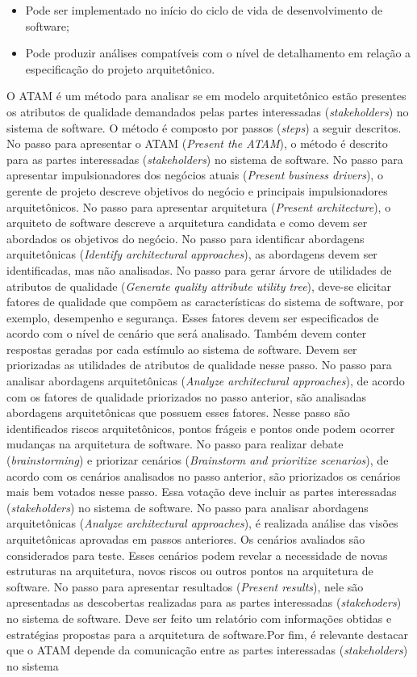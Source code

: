 \begin{itemize}
    \item Pode ser implementado no início do ciclo de vida de desenvolvimento de software;
    \item Pode produzir análises compatíveis com o nível de detalhamento em relação a especificação do projeto arquitetônico.  
\end{itemize}

O ATAM é um método para analisar se em modelo arquitetônico estão presentes os atributos de qualidade demandados pelas partes interessadas (\emph{stakeholders}) no sistema de software. O método é composto por passos (\emph{steps}) a seguir descritos. No passo para apresentar o ATAM (\emph{Present the ATAM}), o método é descrito para as partes interessadas (\emph{stakeholders}) no sistema de software. No passo para apresentar impulsionadores dos negócios atuais (\emph{Present business drivers}), o gerente de projeto descreve objetivos do negócio e principais impulsionadores arquitetônicos. No passo para apresentar arquitetura (\emph{Present architecture}), o arquiteto de software descreve a arquitetura candidata e como devem ser abordados os objetivos do negócio. No passo para identificar abordagens arquitetônicas (\emph{Identify architectural approaches}), as abordagens devem ser identificadas, mas não analisadas. No passo para gerar árvore de utilidades de atributos de qualidade (\emph{Generate quality attribute utility tree}), deve-se elicitar fatores de qualidade que compõem as características do sistema de software, por exemplo, desempenho e segurança. Esses fatores devem ser especificados de acordo com o nível de cenário que será analisado. Também devem conter respostas geradas por cada estímulo ao sistema de software. Devem ser priorizadas as utilidades de atributos de qualidade nesse passo. No passo para analisar abordagens arquitetônicas (\emph{Analyze architectural approaches}), de acordo com os fatores de qualidade priorizados no passo anterior, são analisadas abordagens arquitetônicas que possuem esses fatores. Nesse passo são identificados riscos arquitetônicos, pontos frágeis e pontos onde podem ocorrer mudanças na arquitetura de software. No passo para realizar debate (\emph{brainstorming}) e priorizar cenários (\emph{Brainstorm and prioritize scenarios}), de acordo com os cenários analisados no passo anterior, são priorizados os cenários mais bem votados nesse passo. Essa votação deve incluir as partes interessadas (\emph{stakeholders}) no sistema de software. No passo para analisar abordagens arquitetônicas (\emph{Analyze architectural approaches}), é realizada análise das visões arquitetônicas aprovadas em passos anteriores. Os cenários avaliados são considerados para teste. Esses cenários podem revelar a necessidade de novas estruturas na arquitetura, novos riscos ou outros pontos na arquitetura de software. No passo para apresentar resultados (\emph{Present results}), nele são apresentadas as descobertas realizadas para as partes interessadas (\emph{stakehoders}) no sistema de software. Deve ser feito um relatório com informações obtidas e estratégias propostas para a arquitetura de software.Por fim, é relevante destacar que o ATAM depende da comunicação entre as partes interessadas (\emph{stakeholders}) no sistema 